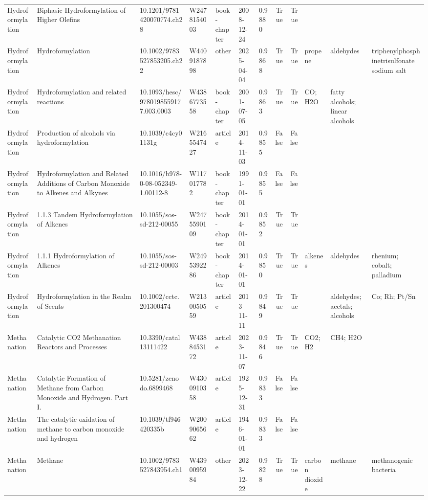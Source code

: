 \begin{tabular}{lllllllrrlll}
Hydroformylation & Biphasic Hydroformylation of Higher Olefins & 10.1201/9781420070774.ch28 & W2478154003 & book-chapter & 2008-12-24 & 0.9880 & True & True &  &  &  \\
Hydroformylation & Hydroformylation & 10.1002/9783527853205.ch22 & W4409187898 & other & 2025-04-04 & 0.9868 & True & True & propene & aldehydes & triphenylphosphinetrisulfonate sodium salt \\
Hydroformylation & Hydroformylation and related reactions & 10.1093/hesc/9780198559177.003.0003 & W4386773558 & book-chapter & 2001-07-05 & 0.9863 & True & True & CO; H2O & fatty alcohols; linear alcohols &  \\
Hydroformylation & Production of alcohols via hydroformylation & 10.1039/c4cy01131g & W2165547427 & article & 2014-11-03 & 0.9855 & False & False &  &  &  \\
Hydroformylation & Hydroformylation and Related Additions of Carbon Monoxide to Alkenes and Alkynes & 10.1016/b978-0-08-052349-1.00112-8 & W117017782 & book-chapter & 1991-01-01 & 0.9855 & False & False &  &  &  \\
Hydroformylation & 1.1.3 Tandem Hydroformylation of Alkenes & 10.1055/sos-sd-212-00055 & W2475590109 & book-chapter & 2014-01-01 & 0.9852 & True & True &  &  &  \\
Hydroformylation & 1.1.1 Hydroformylation of Alkenes & 10.1055/sos-sd-212-00003 & W2495392286 & book-chapter & 2014-01-01 & 0.9850 & True & True & alkenes & aldehydes & rhenium; cobalt; palladium \\
Hydroformylation & Hydroformylation in the Realm of Scents & 10.1002/cctc.201300474 & W2130050559 & article & 2013-11-11 & 0.9849 & True & True &  & aldehydes; acetals; alcohols & Co; Rh; Pt/Sn \\
Methanation & Catalytic CO2 Methanation Reactors and Processes & 10.3390/catal13111422 & W4388453172 & article & 2023-11-07 & 0.9846 & True & True & CO2; H2 & CH4; H2O &  \\
Methanation & Catalytic Formation of Methane from Carbon Monoxide and Hydrogen. Part I. & 10.5281/zenodo.6899468 & W4300910358 & article & 1925-12-31 & 0.9833 & False & False &  &  &  \\
Methanation & The catalytic oxidation of methane to carbon monoxide and hydrogen & 10.1039/tf946420335b & W2009065662 & article & 1946-01-01 & 0.9833 & False & False &  &  &  \\
Methanation & Methane & 10.1002/9783527843954.ch1 & W4390095984 & other & 2023-12-22 & 0.9828 & True & True & carbon dioxide & methane & methanogenic bacteria \\

\end{tabular}

